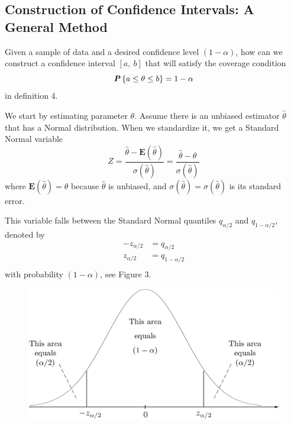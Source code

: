 \subsection{Construction of Confidence Intervals: A General Method}
\label{subsec:const-of-conf-inter-a-gen-method}

Given a sample of data and a desired confidence level $(1 - \alpha)$, how can we construct a confidence interval $\left[ a,\ b \right]$ that will satisfy the coverage condition
\begin{equation*}
  \textbf{\textit{P}}\left\{a \leq \theta \leq b\right\} = 1 - \alpha
\end{equation*}
in definition 4.

We start by estimating parameter $\theta$. Assume there is an unbiased estimator $\hat{\theta}$ that has a Normal distribution. When we standardize it, we get a Standard Normal variable
\begin{equation*}
  Z = \frac{\hat{\theta} - \mathbf{E}(\hat{\theta})}{\sigma(\hat{\theta})} = \frac{\hat{\theta} - \theta}{\sigma(\hat{\theta})}
\end{equation*}
where $\mathbf{E}(\hat{\theta}) = \theta$ because $\hat{\theta}$ is unbiased, and $\sigma(\hat{\theta}) = \sigma(\hat{\theta})$ is its standard error.

\vspace*{\fill}
\columnbreak

This variable falls between the Standard Normal quantiles $q_{\alpha/2}$ and $q_{1 - \alpha/2}$, denoted by
\begin{align*}
  - z_{\alpha/2} &= q_{\alpha / 2}\\
  z_{\alpha/2} &= q_{1 - \alpha / 2}\\
\end{align*}
with probability $(1 - \alpha)$, see Figure 3.
\begin{figure}[H]
  \centering
  \includegraphics[width=\linewidth]{img/fig-9.3.png}
  \caption{}
  \label{fig:9.3}
\end{figure}

